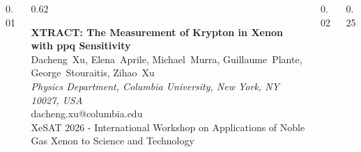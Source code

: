 \documentclass[final]{beamer}
\begin{document}
\begin{frame}{}


\begin{columns}[T, totalwidth=0.9\paperwidth]
  \begin{column}{0.01\paperwidth}
  \end{column}
  \begin{column}{0.62\paperwidth}\raggedright
    {\color{black}\fontsize{70}{50}\bfseries\selectfont
      XTRACT: The Measurement of Krypton in Xenon with ppq Sensitivity} \\[1.0cm]
    {\color{black}\fontsize{40}{25}\selectfont
      Dacheng~Xu,\;
      Elena~Aprile,\;
      Michael~Murra,\;
      Guillaume~Plante,\;
      George~Stouraitis,\;
      Zihao~Xu} \\[0.5cm]
    {\color{black}\fontsize{30}{25}\selectfont
      \textit{Physics Department, Columbia University, New York, NY 10027, USA}} \\[0.5cm]
    dacheng.xu@columbia.edu \\[1.0cm]
    {\color{black}\fontsize{35}{25}\selectfont
      XeSAT 2026 - International Workshop on Applications of Noble Gas Xenon to Science and Technology}
  \end{column}
  \begin{column}{0.02\paperwidth}
  \end{column}
  \begin{column}{0.25\paperwidth}\vspace{4.0cm}
    
  \end{column}
\end{columns}
\vspace{2.5cm}

\begin{columns}[T, totalwidth=\linewidth]


\end{columns}
\end{frame}
\end{document}
